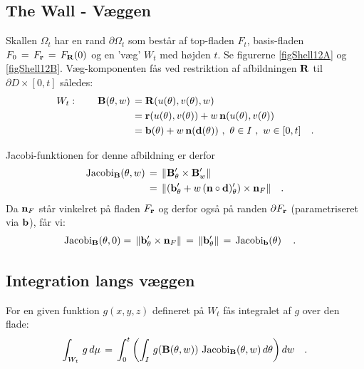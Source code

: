 \subsection{The Wall - Væggen} \label{secWall}

Skallen $\Omega_{t}$ har en rand $\partial
\Omega_{t}$ som består af top-fladen $F_{t}$,
basis-fladen $F_{0} \,=\, F_{\bf{r}} \, = \,
F_{\bf{R}}(0)$ og en 'væg'  $W_{t}$ med højden
$t$. Se figurerne \ref{figShell12A} og \ref{figShell12B}. Væg-komponenten
fås ved restriktion af afbildningen ${\bf{R}}$
til $\partial D \times [0, t]$ således:
\begin{equation}
\begin{aligned}
W_{t}: \qquad  {\bf{B}}(\theta, w) \, &=
{\bf{R}}(u(\theta), v(\theta), w) \\ &=
{\bf{r}}(u(\theta), v(\theta)) +
w\,{\bf{n}}(u(\theta), v(\theta)) \\ &=
{\bf{b}}(\theta) + w\,{\bf{n}}({\bf{d}}(\theta))
\,\, , \,\, \theta \in I \,\, , \, \, w \in [0,
t] \quad .
\end{aligned}
\end{equation}


Jacobi-funktionen for denne afbildning er derfor
\begin{equation} \label{eqFatWall}
\begin{aligned}
\operatorname{Jacobi}_{{\bf{B}}}(\theta, w) \, &= \, \Vert {\bf{B}}'_{\theta} \times {\bf{B}}'_{w} \Vert \\
&= \, \Vert ({\bf{b}}'_{\theta} + w\,({\bf{n}}
\circ {\bf{d}})'_{\theta} ) \times {\bf{n}}_{F}
\Vert \quad .
\end{aligned}
\end{equation}
Da ${\bf{n}}_{F}$ står vinkelret på  fladen
$F_{\bf{r}}$ og derfor også på randen $\partial
F_{\bf{r}}$ (parametriseret via ${\bf{b}}$), får
vi:
\begin{equation}
\begin{aligned}
\operatorname{Jacobi}_{{\bf{B}}}(\theta, 0) = \,
\Vert{\bf{b}}'_{\theta} \times {\bf{n}}_{F} \Vert
\, &= \,\Vert {\bf{b}}'_{\theta} \Vert \, = \,
\operatorname{Jacobi}_{{\bf{b}}}(\theta)\, \quad .
\end{aligned}
\end{equation}


\subsection{Integration langs væggen} \label{secWallInt}
For en given funktion $g(x,y,z)$ defineret på
$W_{t}$ fås integralet af $g$ over den flade:
\begin{equation}
\int_{W_{t}}\, g\, d\mu \, = \,
\int_{0}^{t}\left(\int_{I}\,g({\bf{B}}(\theta,
w))\,\operatorname{Jacobi}_{{\bf{B}}}(\theta, w)\,d\theta\right)
dw \quad.
\end{equation}

